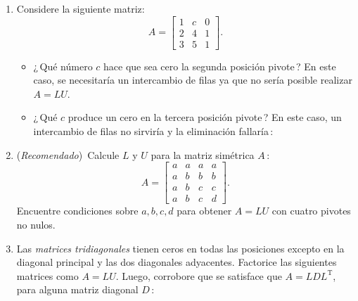 \documentclass[12pt,a4paper]{article}
\newcommand\1{\mbox{\,\vrule height-0.8pt depth1.0pt width2pc\,}}
\newcommand\2{\mbox{\,\vrule height-0.8pt depth1.0pt width1pc\,}}
\DeclareRobustCommand\transp{^{\mathrm{T}}}
\begin{document}
\begin{enumerate}
\item
Considere la siguiente matriz:
\begin{displaymath}
  A=\begin{bmatrix}
    1 & c & 0\\ 2 & 4 & 1\\ 3 & 5 & 1
  \end{bmatrix}.
\end{displaymath}

\begin{itemize}
\item[(a)]¿\,Qué número $c$ hace que sea cero la segunda posición pivote\,?
  En este caso, se necesitaría un intercambio de filas ya que no sería posible realizar $A=LU$.
  
\item[(b)]¿\,Qué $c$ produce un cero en la tercera posición pivote\,?
  En este caso, un intercambio de filas no sirviría y la eliminación fallaría\,:
\end{itemize}
%
%

\item (\emph{Recomendado})\, Calcule $L$ y $U$ para la matriz sim\'etrica $A$\,:
\begin{displaymath}
  A=\begin{bmatrix} a & a & a & a\\ a & b & b & b\\
    a & b & c & c\\ a & b & c & d\end{bmatrix}.
\end{displaymath}
%
Encuentre condiciones sobre $a,b,c,d$ para obtener $A=LU$ con cuatro pivotes no nulos.\linebreak\vspace{-11pt}

\item Las \emph{matrices tridiagonales} tienen ceros en todas las posiciones excepto en la diagonal principal y las dos diagonales adyacentes. Factorice las siguientes matrices como $A=LU$.
Luego, corrobore que se satisface que $A=LDL\transp$, para alguna matriz diagonal $D$\,:


\end{enumerate}
\end{document}
